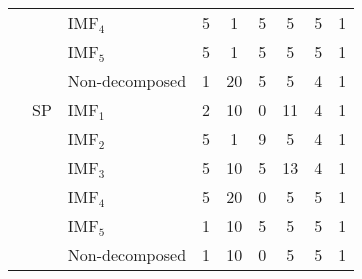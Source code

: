 {\begin{longtable}[htb!]{cclc|cc|c|c|c}
                      &                     & IMF$_4$        & 5 & 1  & 5 & 5  & 5 & 1 \\
                      &                     & IMF$_5$        & 5 & 1  & 5 & 5  & 5 & 1 \\
                      &                     & Non-decomposed & 1 & 20 & 5 & 5  & 4 & 1 \\ \cline{2-9}
                      & {SP} & IMF$_1$        & 2 & 10 & 0 & 11 & 4 & 1 \\
                      &                     & IMF$_2$        & 5 & 1  & 9 & 5  & 4 & 1 \\
                      &                     & IMF$_3$        & 5 & 10 & 5 & 13 & 4 & 1 \\
                      &                     & IMF$_4$        & 5 & 20 & 0 & 5  & 5 & 1 \\
                      &                     & IMF$_5$        & 1 & 10 & 5 & 5  & 5 & 1 \\
                      &                     & Non-decomposed & 1 & 10 & 0 & 5  & 5 & 1 \\ \hline
\end{longtable}%
}

